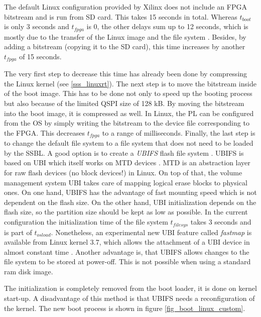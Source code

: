 The default Linux configuration provided by Xilinx does not include an \ac{FPGA} bitstream and is run from \ac{SD} card.
This takes 15 seconds in total.
Whereas $t_{boot}$ is only 3 seconds and $t_{fpga}$ is 0, the other delays sum up to 12 seconds, which is mostly due to the transfer of the Linux image and the file system . 
Besides, by adding a bitstream (copying it to the \ac{SD} card), this time increases by another $ t_{fpga} $ of 15 seconds.   
\par
The very first step to decrease this time has already been done by compressing the Linux kernel (see \ref{sss_linuxrt}).
The next step is to move the bitstream inside of the boot image.
This has to be done not only to speed up the booting process but also because of the limited \ac{QSPI} size of 128 kB.
By moving the bitstream into the boot image, it is compressed as well. 
In Linux, the \ac{PL} can be configured from the \ac{OS} by simply writing the bitstream to the device file corresponding to the \ac{FPGA}. 
This decreases $t_{fpga}$ to a range of milliseconds. 
Finally, the last step is to change the default file system to a file system that does not need to be loaded by the \ac{SSBL}.
A good option is to create a \textit{\ac{UBIFS}} flash file system \cite{ubifs}.
\ac{UBIFS} is based on \ac{UBI} which itself works on \ac{MTD} devices \cite{mtd}.
\ac{MTD} is an abstraction layer for raw flash devices (no block devices!) in Linux.
On top of that, the volume management system \ac{UBI} takes care of mapping logical erase blocks to physical ones.  
On one hand, \ac{UBIFS} has the advantage of fast mounting speed which is not dependent on the flash size.
On the other hand, \ac{UBI} initialization depends on the flash size, so the partition size should be kept as low as possible.
In the current configuration the initialization time of the file system $t_{filesys}$ takes 3 seconds and is part of $t_{osload}$.
Nonetheless, an experimental new \ac{UBI} feature called \textit{fastmap} is available from Linux kernel 3.7, which allows the attachment of a \ac{UBI} device in almost constant time \cite{ubi}.
Another advantage is, that \ac{UBIFS} allows changes to the file system to be stored at power-off.
This is not possible when using a standard ram disk image.
\par
The initialization is completely removed from the boot loader, it is done on kernel start-up.
A disadvantage of this method is that \ac{UBIFS} needs a reconfiguration of the kernel.
The new boot process is shown in figure \ref{fig_boot_linux_custom}. 

